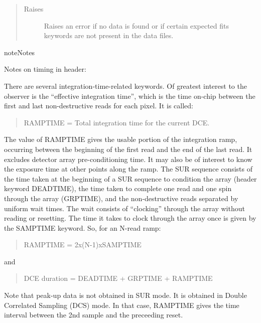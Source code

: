\documentclass[a4paper,10pt,english]{sphinxmanual}
\begin{document}
\begin{fulllineitems}
\begin{fulllineitems}
\begin{quote}
\begin{description}
\item[{Raises}] \leavevmode
{} \textendash{} Raises an error if no data is found or if certain expected
fits keywords are not present in the data files.

\end{description}\end{quote}

\begin{sphinxadmonition}{note}{Notes}

Notes on timing in header:

There are several integration-time-related keywords.
Of greatest interest to the observer is the
“effective integration time”, which is the time on-chip between
the first and last non-destructive reads for each pixel. It is called:
\begin{quote}

RAMPTIME = Total integration time for the current DCE.
\end{quote}

The value of RAMPTIME gives the usable portion of the integration ramp,
occurring between the beginning of the first read and the end of the
last read. It excludes detector array pre-conditioning time.
It may also be of interest to know the exposure time at other points
along the ramp. The SUR sequence consists of the time taken at the
beginning of a SUR sequence to condition the array
(header keyword DEADTIME), the time taken to complete one read and
one spin through the array (GRPTIME), and the non-destructive reads
separated by uniform wait times. The wait consists of “clocking”
through the array without reading or resetting. The time it takes to
clock through the array once is given by the SAMPTIME keyword.
So, for an N-read ramp:
\begin{quote}

RAMPTIME = 2x(N-1)xSAMPTIME
\end{quote}

and
\begin{quote}

DCE duration = DEADTIME + GRPTIME + RAMPTIME
\end{quote}

Note that peak-up data is not obtained in SUR mode. It is obtained in
Double Correlated Sampling (DCS) mode. In that case, RAMPTIME gives the
time interval between the 2nd sample and the preceeding reset.
\end{sphinxadmonition}

\end{fulllineitems}


\end{fulllineitems}
\end{document}
